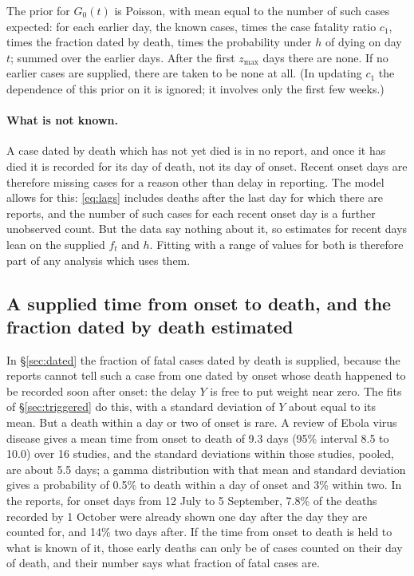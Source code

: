 \documentclass[11pt,a4paper]{article}
\begin{document}
The prior for $G_0(t)$ is Poisson, with mean equal to the number of such
cases expected: for each earlier day, the known cases, times the case
fatality ratio $c_1$, times the fraction dated by death, times the
probability under $h$ of dying on day $t$; summed over the earlier days.
After the first $z_{\max}$ days there are none. If no earlier cases are
supplied, there are taken to be none at all. (In updating $c_1$ the
dependence of this prior on it is ignored; it involves only the first few
weeks.)

\paragraph{What is not known.} A case dated by death which has not yet died
is in no report, and once it has died it is recorded for its day of death, not
its day of onset. Recent onset days are therefore missing cases for a reason
other than delay in reporting. The model allows for this: \eqref{eq:lags}
includes deaths after the last day for which there are reports, and the
number of such cases for each recent onset day is a further unobserved
count. But the data say nothing about it, so estimates for recent
days lean on the supplied $f_t$ and $h$. Fitting with a range of values for
both is therefore part of any analysis which uses them.

\subsection{A supplied time from onset to death, and the fraction dated by death estimated}\label{sec:misdated}

In \S\ref{sec:dated} the fraction of fatal cases dated by death is supplied,
because the reports cannot tell such a case from one dated by onset whose
death happened to be recorded soon after onset: the delay $Y$ is free to put
weight near zero. The fits of \S\ref{sec:triggered} do this, with a standard
deviation of $Y$ about equal to its mean. But a death within a day or two of
onset is rare. A review of Ebola virus disease gives a mean time from onset
to death of 9.3 days (95\% interval 8.5 to 10.0) over 16 studies, and the
standard deviations within those studies, pooled, are about 5.5 days; a
gamma distribution with that mean and standard deviation gives a probability
of 0.5\% to death within a day of onset and 3\% within two. In the reports,
for onset days from 12 July to 5 September, 7.8\% of the deaths recorded by
1 October were already shown one day after the day they are counted for, and
14\% two days after. If the time from onset to death is held to what is
known of it, those early deaths can only be of cases counted on their day of
death, and their number says what fraction of fatal cases are.
\end{document}

